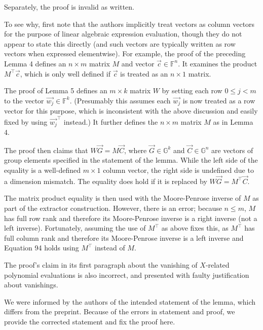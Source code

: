 \documentclass{article}
\begin{document}
Separately, the proof is invalid as written.

To see why, first note that the authors implicitly treat vectors as column vectors for the purpose of linear algebraic expression evaluation, though they do not appear to state this directly (and such vectors are typically written as row vectors when expressed elementwise).
For example, the proof of the preceding Lemma 4 defines an $n \times m$ matrix $M$ and vector $\vec{c} \in \mathbb{F}^n$.
It examines the product $M^\top \vec{c}$, which is only well defined if $\vec{c}$ is treated as an $n \times 1$ matrix.

The proof of Lemma 5 defines an $m \times k$ matrix $W$ by setting each row $0 \leq j < m$ to the vector $\vec{w_j} \in \mathbb{F}^k$.
(Presumably this assumes each $\vec{w_j}$ is now treated as a row vector for this purpose, which is inconsistent with the above discussion and easily fixed by using $\vec{w_j}^\top$ instead.)
It further defines the $n \times m$ matrix $M$ as in Lemma 4.

The proof then claims that $W \vec{G} = M \vec{C}$, where $\vec{G} \in \mathbb{G}^k$ and $\vec{C} \in \mathbb{G}^n$ are vectors of group elements specified in the statement of the lemma.
While the left side of the equality is a well-defined $m \times 1$ column vector, the right side is undefined due to a dimension mismatch.
The equality does hold if it is replaced by $W \vec{G} = M^\top \vec{C}$.

The matrix product equality is then used with the Moore-Penrose inverse of $M$ as part of the extractor construction.
However, there is an error; because $n \leq m$, $M$ has full row rank and therefore its Moore-Penrose inverse is a right inverse (not a left inverse).
Fortunately, assuming the use of $M^\top$ as above fixes this, as $M^\top$ has full column rank and therefore its Moore-Penrose inverse is a left inverse and Equation 94 holds using $M^\top$ instead of $M$.

The proof's claim in its first paragraph about the vanishing of $X$-related polynomial evaluations is also incorrect, and presented with faulty justification about vanishings.

We were informed by the authors of the intended statement of the lemma, which differs from the preprint.
Because of the errors in statement and proof, we provide the corrected statement and fix the proof here.
\end{document}
